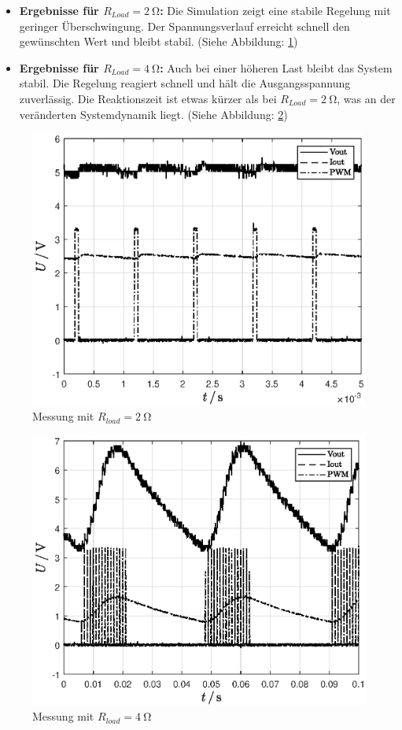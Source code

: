 \begin{itemize}
    \item \textbf{Ergebnisse für $R_{Load}=\SI{2}{\ohm}$:} Die Simulation zeigt eine stabile Regelung mit geringer Überschwingung. Der Spannungsverlauf erreicht schnell den gewünschten Wert und bleibt stabil. (Siehe Abbildung: \ref{fig:Rload2})
    \item \textbf{Ergebnisse für $R_{Load}=\SI{4}{\ohm}$:} Auch bei einer höheren Last bleibt das System stabil. Die Regelung reagiert schnell und hält die Ausgangsspannung zuverlässig. Die Reaktionszeit ist etwas kürzer als bei $R_{Load}=\SI{2}{\ohm}$, was an der veränderten Systemdynamik liegt. (Siehe Abbildung: \ref{fig:Rload4})
\end{itemize}

\begin{figure}[H]
    \centering
    \includegraphics[width=0.6\linewidth]{Figure/Rload2.eps}
    \caption{Messung mit $R_{load} = \SI{2}{\ohm}$}
    \label{fig:Rload2}
\end{figure}

\begin{figure}[H]
    \centering
    \includegraphics[width=0.6\linewidth]{Figure/Rload4.eps}
    \caption{Messung mit $R_{load} = \SI{4}{\ohm}$}
    \label{fig:Rload4}
\end{figure}
